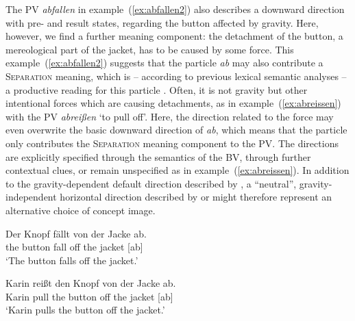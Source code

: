 \documentclass[output=paper]{langsci/langscibook}
\begin{document}
The PV \textit{abfallen} in example~(\ref{ex:abfallen2}) also
describes a downward direction with pre- and result states, regarding
the button affected by gravity. Here, however, we find a further meaning
component: the detachment of the button, a mereological part of the
jacket, has to be caused by some force. This
example~(\ref{ex:abfallen2}) suggests that the particle \textit{ab} may
also contribute a \textsc{Separation} meaning, which is -- according to
previous lexical semantic analyses -- a productive reading for this
particle \citep{Kliche:11ALTER}. Often, it is not gravity but other
intentional forces which are causing detachments, as in
example~(\ref{ex:abreissen}) with the PV \textit{abreißen} `to pull
off'. Here, the direction related to the force may even overwrite the
basic downward direction of \textit{ab}, which means that the particle
only contributes the \textsc{Separation} meaning component to the
PV. The directions are explicitly specified through the semantics of
the BV, through further contextual clues, or remain unspecified as in
example~(\ref{ex:abreissen}). In addition to the gravity-dependent
default direction described by , a ``neutral'',
gravity-independent horizontal direction described by
 or  might therefore represent an
alternative choice of concept image.

\ea\label{ex:abfallen2}
\gll Der Knopf fällt von der Jacke ab.\\
the button fall off the jacket [ab]\\
\glt `The button falls off the jacket.'  
\z

\ea\label{ex:abreissen}
\gll Karin reißt den Knopf von der Jacke ab.\\
Karin pull the button off the jacket [ab]\\
\glt `Karin pulls the button off the jacket.'
\z
\end{document}
